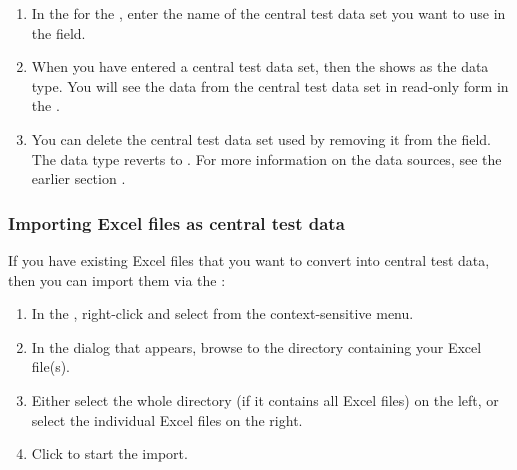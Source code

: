 \begin{enumerate}
\item In the \gdpropview{} for the \gdcase{}, enter the name of the central test data set you want to use in the   field. 
\item When you have entered a central test data set, then the \gdpropview{} shows  as the data type. You will see the data from the central test data set in read-only form in the \gddatasetsview{}.
\item You can delete the central test data set used by removing it from the  field. The data type reverts to .
For more information on the data sources, see the earlier section .
\end{enumerate}

\subsubsection{Importing Excel files as central test data}
\label{TasksCentralDataImport}

If you have existing Excel files that you want to convert into central test data, then you can import them via the \gddataeditor{}:

\begin{enumerate}
\item In the \gddataeditor{}, right-click and select  from the context-sensitive menu.
\item In the dialog that appears, browse to the directory containing your Excel file(s).
\item Either select the whole directory (if it contains all Excel files) on the left, or select the individual Excel files on the right.
\item Click  to start the import.
\end{enumerate}


